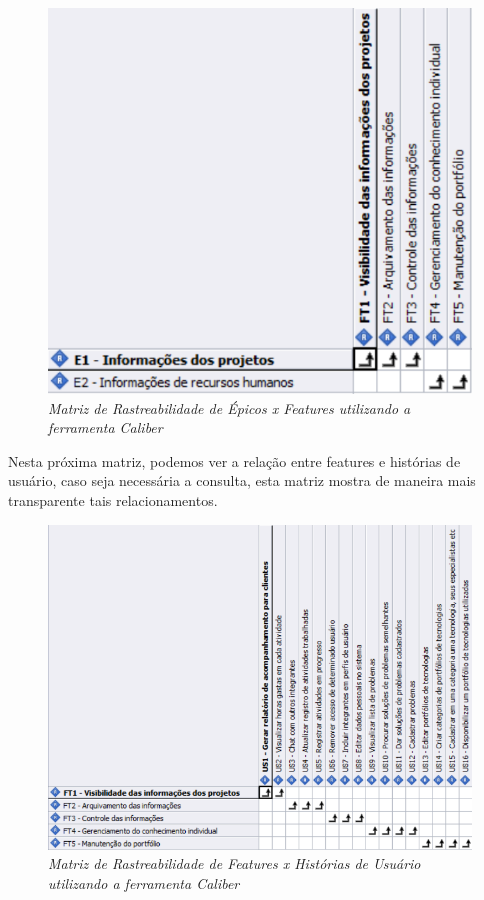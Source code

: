\begin{figure}[H]
\centering\includegraphics[scale=0.5]{figuras/rastreabilidade1.png}
\caption{\textit{Matriz de Rastreabilidade de Épicos x Features utilizando a ferramenta Caliber}}
\end{figure}

Nesta próxima matriz, podemos ver a relação entre features e histórias de usuário, caso seja necessária a consulta, esta matriz mostra de maneira mais transparente tais relacionamentos.

\begin{figure}[H]
\centering\includegraphics[scale=0.5]{figuras/rastreabilidade2.png}
\caption{\textit{Matriz de Rastreabilidade de Features x Histórias de Usuário utilizando a ferramenta Caliber}}
\end{figure}

